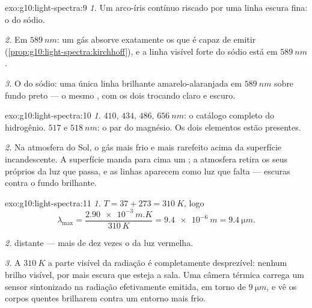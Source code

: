 \begin{solution}{exo:g10:light-spectra:9}
\emph{1.} Um arco-íris contínuo riscado por uma linha escura fina: o
 do sódio.

\emph{2.} Em $\qty{589}{nm}$: um gás absorve exatamente os  que é capaz de emitir (\cref{prop:g10:light-spectra:kirchhoff}), e a
linha visível forte do sódio está em $\qty{589}{nm}$.

\emph{3.} O  do sódio: uma única linha brilhante
amarelo-alaranjada em $\qty{589}{nm}$ sobre fundo preto --- o mesmo
, com os dois  trocando claro e escuro.
\end{solution}

\begin{solution}{exo:g10:light-spectra:10}
\emph{1.} $410$, $434$, $486$, $\qty{656}{nm}$: o catálogo completo do
hidrogênio. $517$ e $\qty{518}{nm}$: o par do magnésio. Os dois elementos
estão presentes.

\emph{2.} Na atmosfera do Sol, o gás mais frio e mais rarefeito acima da
superfície incandescente. A superfície manda para cima um ;
a atmosfera retira os seus próprios  da luz que passa, e
as linhas aparecem como luz que falta --- escuras contra o fundo brilhante.
\end{solution}

\begin{solution}{exo:g10:light-spectra:11}
\emph{1.} $T = 37 + 273 = \qty{310}{K}$, logo
\[
\lambda_{\max} = \frac{\qty{2.90e-3}{m.K}}{\qty{310}{K}}
= \qty{9.4e-6}{m} = \qty{9.4}{\micro m}.
\]

\emph{2.}  distante --- mais de dez vezes o 
da luz vermelha.

\emph{3.} A $\qty{310}{K}$ a parte visível da radiação é completamente
desprezível: nenhum brilho visível, por mais escura que esteja a sala. Uma
câmera térmica carrega um sensor sintonizado na radiação efetivamente
emitida, em torno de $\qty{9}{\micro m}$, e vê os corpos quentes brilharem
contra um entorno mais frio.
\end{solution}

